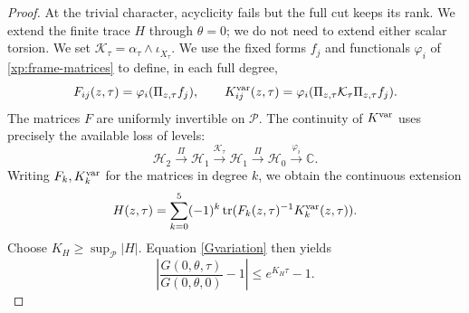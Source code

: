 \documentclass[11pt,letterpaper,reqno]{amsart}
\theoremstyle{remark}
\newcommand{\tr}{\operatorname{tr}}
\begin{document}
\begin{proof}
At the trivial character, acyclicity fails but the full cut keeps
its rank. We extend the finite trace $H$ through $\theta=0$;
we do not need to extend either scalar torsion. We set
$\mathcal K_\tau=\alpha_\tau\wedge\iota_{\dot X_\tau}$.
We use the fixed forms $f_j$ and functionals $\varphi_i$ of
\eqref{xp:frame-matrices} to define, in each full degree,
\[
 F_{ij}(z,\tau)=\varphi_i(\Pi_{z,\tau}f_j),\qquad
 K^{\rm var}_{ij}(z,\tau)=\varphi_i
       (\Pi_{z,\tau}\mathcal K_\tau\Pi_{z,\tau}f_j).
\]
The matrices $F$ are uniformly invertible on $\mathcal P$.
The continuity of $K^{\rm var}$
uses precisely the available loss of levels:
\[
 \mathcal H_2\xrightarrow{\Pi}\mathcal H_1
 \xrightarrow{\mathcal K_\tau}\mathcal H_1
 \xrightarrow{\Pi}\mathcal H_0
 \xrightarrow{\varphi_i}\mathbb C.
\]
Writing $F_k,K^{\rm var}_k$ for the matrices in degree $k$, we obtain the
continuous extension
\[
 H(z,\tau)=\sum_{k=0}^5(-1)^k
          \tr(F_k(z,\tau)^{-1}K^{\rm var}_k(z,\tau)).
\]
Choose $K_H\geq\sup_{\mathcal P}|H|$. Equation \eqref{Gvariation}
then yields
\[
 \left|\frac{G(0,\theta,\tau)}{G(0,\theta,0)}-1\right|
 \leq e^{K_H\tau}-1.
\]
\end{proof}
\end{document}
